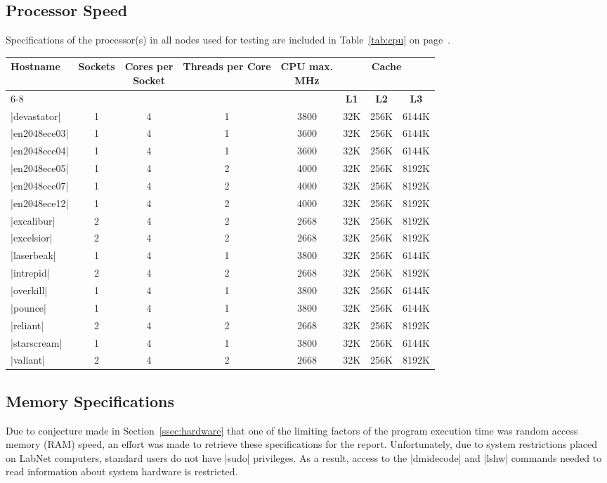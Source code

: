 \subsection{Processor Speed}
Specifications of the processor(s) in all nodes used for testing are 
included in Table~\ref{tab:cpu} on page~\pageref{tab:cpu}. 
\begin{table*}[ht]
	\centering\small
	\def\arraystretch{1.1}
	\begin{tabular}{lccccccc} \hline 
		\multirow{2}{*}{\bf Hostname} & \multirow{2}{*}{\bf Sockets} & \multirow{2}{*}{\parbox{1.75cm}{\centering\bf Cores per\\Socket}} & \multirow{2}{*}{\parbox{2cm}{\centering\bf Threads per Core}} & \multirow{2}{*}{\parbox{1.75cm}{\centering\bf CPU max.\\MHz}} & \multicolumn{3}{c}{\bf Cache}  \\ \cline{6-8}
		& & & & & {\bf L1} & {\bf L2} & {\bf L3} \\ \hline 
		|devastator| & 1 & 4 & 1 & 3800 & 32K & 256K & 6144K \\
		|en2048ece03| & 1 & 4 & 1 & 3600 & 32K & 256K & 6144K \\
		|en2048ece04| & 1 & 4 & 1 & 3600 & 32K & 256K & 6144K \\
		|en2048ece05| & 1 & 4 & 2 & 4000 & 32K & 256K & 8192K \\
		|en2048ece07| & 1 & 4 & 2 & 4000 & 32K & 256K & 8192K \\
		|en2048ece12| & 1 & 4 & 2 & 4000 & 32K & 256K & 8192K \\
		|excalibur| & 2 & 4 & 2 & 2668 & 32K & 256K & 8192K \\
		|excelsior| & 2 & 4 & 2 & 2668 & 32K & 256K & 8192K \\
		|laserbeak| & 1 & 4 & 1 & 3800 & 32K & 256K & 6144K \\
		|intrepid| & 2 & 4 & 2 & 2668 & 32K & 256K & 8192K \\
		|overkill| & 1 & 4 & 1 & 3800 & 32K & 256K & 6144K \\
		|pounce| & 1 & 4 & 1 & 3800 & 32K & 256K & 6144K \\
		|reliant| & 2 & 4 & 2 & 2668 & 32K & 256K & 8192K \\
		|starscream| & 1 & 4 & 1 & 3800 & 32K & 256K & 6144K \\ 
		|valiant| & 2 & 4 & 2 & 2668 & 32K & 256K & 8192K \\ \hline
	\end{tabular}
	\caption{Computer CPU Specifications\label{tab:cpu}}
\end{table*}

\subsection{Memory Specifications}
Due to conjecture made in Section~\ref{ssec:hardware} that one of the
limiting factors of the program execution time was random access 
memory (RAM) speed, an effort was made to retrieve these specifications
for the report. Unfortunately, due to system restrictions placed on 
LabNet computers, standard users do not have |sudo| privileges.
As a result, access to the |dmidecode| and |lshw| commands
needed to read information about system hardware is restricted.